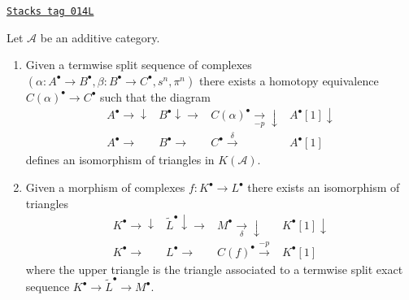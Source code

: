 \begin{lemma}
\label{derived-lemma-the-same-up-to-isomorphisms}
\href{https://stacks.math.columbia.edu/tag/014L}{\texttt{Stacks tag 014L}}

Let $\mathcal{A}$ be an additive category.
\begin{enumerate}
\item Given a termwise split sequence of complexes
$(\alpha : A^\bullet \to B^\bullet,
\beta : B^\bullet \to C^\bullet, s^n, \pi^n)$
there exists a homotopy equivalence $C(\alpha)^\bullet \to C^\bullet$
such that the diagram
$$
\begin{array}{cccc}A^\bullet \longrightarrow\downarrow & B^\bullet \downarrow\longrightarrow & C(\alpha)^\bullet \underset{-p}{\longrightarrow}\downarrow & A^\bullet[1] \downarrow \\ A^\bullet \longrightarrow & B^\bullet \longrightarrow & C^\bullet \overset{\delta}{\longrightarrow} & A^\bullet[1]\end{array}
$$
defines an isomorphism of triangles in $K(\mathcal{A})$.
\item Given a morphism of complexes $f : K^\bullet \to L^\bullet$
there exists an isomorphism of triangles
$$
\begin{array}{cccc}K^\bullet \longrightarrow\downarrow & \tilde L^\bullet \downarrow\longrightarrow & M^\bullet \underset{\delta}{\longrightarrow}\downarrow & K^\bullet[1] \downarrow \\ K^\bullet \longrightarrow & L^\bullet \longrightarrow & C(f)^\bullet \overset{-p}{\longrightarrow} & K^\bullet[1]\end{array}
$$
where the upper triangle is the triangle associated to a
termwise split exact sequence $K^\bullet \to \tilde L^\bullet \to M^\bullet$.
\end{enumerate}
\end{lemma}

